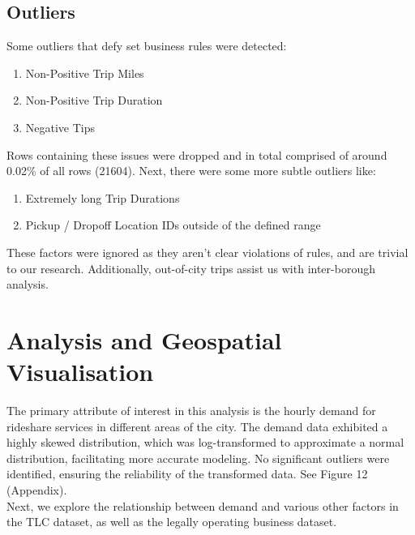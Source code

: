 \documentclass[11pt]{article}
\begin{document}
\subsection{Outliers}
Some outliers that defy set business rules were detected:
\begin{enumerate} 
    \item Non-Positive Trip Miles
    \item Non-Positive Trip Duration
    \item Negative Tips
\end{enumerate}
Rows containing these issues were dropped and in total comprised of around 0.02\% of all rows (21604).
Next, there were some more subtle outliers like:
\begin{enumerate} 
    \item Extremely long Trip Durations
    \item Pickup / Dropoff Location IDs outside of the defined range
\end{enumerate}
These factors were ignored as they aren’t clear violations of rules, and are trivial to our research. Additionally, out-of-city trips assist us with inter-borough analysis.

\section{Analysis and Geospatial Visualisation}
The primary attribute of interest in this analysis is the hourly demand for rideshare services in different areas of the city. The demand data exhibited a highly skewed distribution, which was log-transformed to approximate a normal distribution, facilitating more accurate modeling. No significant outliers were identified, ensuring the reliability of the transformed data. See Figure 12 (Appendix).\\

Next, we explore the relationship between demand and various other factors in the TLC dataset, as well as the legally operating business dataset.
\end{document}
